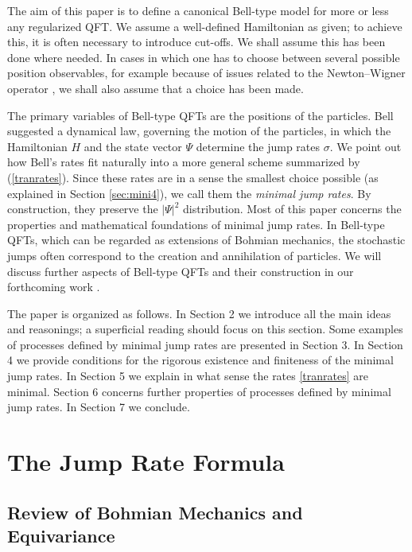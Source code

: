 \documentclass[12pt]{article}
\newcommand{\1}{\mathbf{1}} %
\begin{document}
The aim of this paper is to define a canonical Bell-type model for
more or less any regularized QFT. We assume a well-defined Hamiltonian
as given; to achieve this, it is often necessary to introduce
cut-offs. We shall assume this has been done where needed.  In cases
in which one has to choose between several possible position
observables, for example because of issues related to the
Newton--Wigner operator \cite{NewtonWigner,Haag}, we shall also assume
that a choice has been made.

The primary variables of Bell-type QFTs are the positions of the
particles.  Bell suggested a dynamical law, governing the motion of
the particles, in which the Hamiltonian $H$ and the state vector
$\Psi$ determine the jump rates $\sigma$.  We point out how Bell's
rates fit naturally into a more general scheme summarized by
(\ref{tranrates}).  Since these rates are in a sense the smallest
choice possible (as explained in Section \ref{sec:mini4}), we call
them the \emph{minimal jump rates}.  By construction, they preserve
the $|\Psi|^2$ distribution.  Most of this paper concerns the
properties and mathematical foundations of minimal jump rates.  In
Bell-type QFTs, which can be regarded as extensions of Bohmian
mechanics, the stochastic jumps often correspond to the creation and
annihilation of particles. We will discuss further aspects of
Bell-type QFTs and their construction in our forthcoming work
\cite{crea2B}.

The paper is organized as follows.  In Section 2 we introduce all the
main ideas and reasonings; a superficial reading should focus on this
section.  Some examples of processes defined by minimal jump rates are
presented in Section 3.  In Section 4 we provide conditions for the
rigorous existence and finiteness of the minimal jump rates.  In
Section 5 we explain in what sense the rates \eqref{tranrates} are
minimal. Section 6 concerns further properties of processes defined by
minimal jump rates.  In Section 7 we conclude.




\section{The Jump Rate Formula}
\label{sec:making}

\subsection{Review of Bohmian Mechanics and Equivariance}
\end{document}

